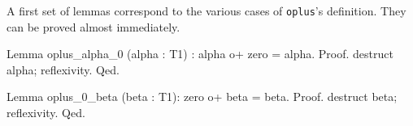 A first set of lemmas correspond to the various cases of \texttt{oplus}'s 
definition. They can be proved almost immediately.

\begin{Coqsrc}
Lemma oplus_alpha_0 (alpha : T1) : alpha o+ zero = alpha.
Proof.
  destruct alpha; reflexivity.
Qed.

Lemma oplus_0_beta (beta : T1): zero o+ beta = beta.
Proof.
  destruct beta; reflexivity.
Qed.
\end{Coqsrc}












